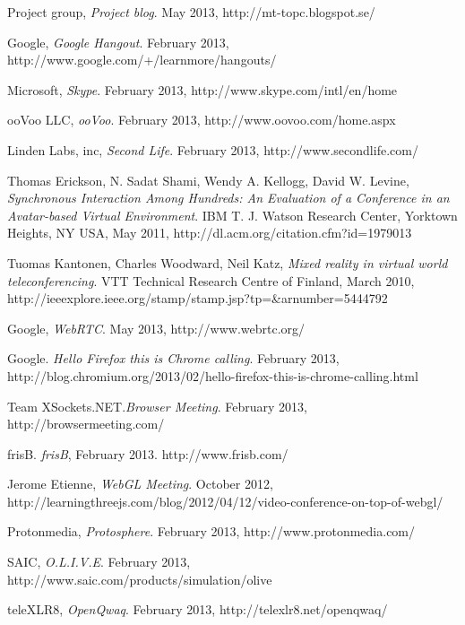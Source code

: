 \documentclass[12pt, titlepage]{article}
\begin{document}
\begin{thebibliography}{9}
  Project group,
  \emph{Project blog}.
  May 2013,
  http://mt-topc.blogspot.se/
  
  Google,
  \emph{Google Hangout}.
  February 2013,
  http://www.google.com/+/learnmore/hangouts/
  
  Microsoft,
  \emph{Skype}.
  February 2013,
  http://www.skype.com/intl/en/home  
  
  ooVoo LLC,
  \emph{ooVoo}.
  February 2013,
  http://www.oovoo.com/home.aspx  

  Linden Labs, inc,
  \emph{Second Life}.
  February 2013,
  http://www.secondlife.com/
   
  Thomas Erickson, N. Sadat Shami, Wendy A. Kellogg, David W. Levine,
  \emph{Synchronous Interaction Among Hundreds: An Evaluation of a Conference in an Avatar-based Virtual Environment}.
 IBM T. J. Watson Research Center, Yorktown Heights, NY USA,
  May 2011,
  http://dl.acm.org/citation.cfm?id=1979013

  Tuomas Kantonen, Charles Woodward, Neil Katz,
  \emph{Mixed reality in virtual world teleconferencing}.
  VTT Technical Research Centre of Finland,
  March 2010,
  http://ieeexplore.ieee.org/stamp/stamp.jsp?tp=\&arnumber=5444792

  Google,
  \emph{WebRTC}.
  May 2013,
  http://www.webrtc.org/
  
Google. 
\emph{Hello Firefox this is Chrome calling}.
 February 2013, http://blog.chromium.org/2013/02/hello-firefox-this-is-chrome-calling.html   
 
Team XSockets.NET.\emph{Browser Meeting}. February 2013, http://browsermeeting.com/

 frisB. \emph{frisB}, February 2013. http://www.frisb.com/
 
Jerome Etienne, \emph{WebGL Meeting}.
October 2012,
http://learningthreejs.com/blog/2012/04/12/video-conference-on-top-of-webgl/

  Protonmedia,
  \emph{Protosphere}.
  February 2013,
  http://www.protonmedia.com/

  SAIC,
  \emph{O.L.I.V.E}.
  February 2013,\linebreak
  http://www.saic.com/products/simulation/olive

  teleXLR8,
  \emph{OpenQwaq}.
  February 2013,
  http://telexlr8.net/openqwaq/
  

\end{thebibliography}
\end{document}
